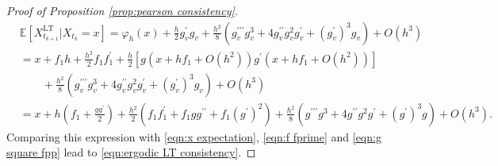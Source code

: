 \documentclass[a4paper,12pt]{article}
\numberwithin{equation}{section}
\theoremstyle{plain}
\theoremstyle{definition}
\begin{document}
\begin{appendix}
\begin{proof}[Proof of Proposition \ref{prop:pearson consistency}]
\begin{align*}
    &\mathbb{E}[X^{\textrm{LT}}_{t_{k+1}}|X_{t_k}=x]=\varphi_h(x)+\frac{h}{2}g^{\prime}_vg_v+\frac{h^2}{8}(g^{\prime\prime\prime}_vg^3_v+4g^{\prime\prime}_vg^2_vg^{\prime}_v+(g^{\prime}_v)^3g_v)+O(h^3)\\
    &=x+f_1h+\frac{h^2}{2}f_1f_1^{\prime}+\frac{h}{2}\left[g(x+hf_1+O(h^2))g^{\prime}(x+hf_1+O(h^2))\right]\\
    &\qquad +\frac{h^2}{8}(g^{\prime\prime\prime}_vg^3_v+4g^{\prime\prime}_vg^2_vg^{\prime}_v+(g^{\prime}_v)^3g_v)+O(h^3)\\
    &=x+h(f_1+\frac{gg^{\prime}}{2})+\frac{h^2}{2}(f_1f_1^{\prime}+f_1gg^{\prime\prime}+f_1(g^{\prime})^2)+\frac{h^2}{8}(g^{\prime\prime\prime}g^3+4g^{\prime\prime}g^2g^{\prime}+(g^{\prime})^3g)+O(h^3).
\end{align*}
Comparing this expression with \eqref{eqn:x expectation}, \eqref{eqn:f fprime} and \eqref{eqn:g square fpp} lead to \eqref{eqn:ergodic LT consistency}.


\end{proof}
\end{appendix}
\end{document}
